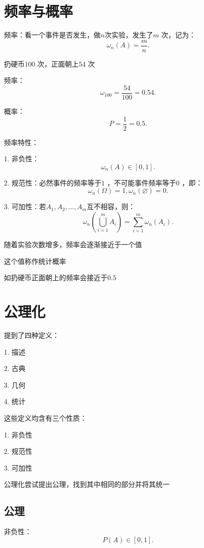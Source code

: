 \section{频率与概率}%
\label{sec:频率与概率}
频率：看一个事件是否发生，做$n $次实验，发生了$m$ 次，记为：
\[
    \omega_n\left( A \right) =\frac{m}{n}
.\] 
\begin{eg}
    扔硬币$100$ 次，正面朝上$54$ 次

    频率：\[
        \omega_{100}=\frac{54}{100}=0.54
    .\] 

    概率：\[
        P=\frac{1}{2}=0.5
    .\] 
\end{eg}
\begin{notation}
    频率特性：

    1. 非负性：\[
        \omega_n\left( A \right) \in \left[ 0,1 \right] 
    .\]
    
    2. 规范性：必然事件的频率等于$1$ ，不可能事件频率等于$0$ ，即：
    \[
        \omega_n\left( \Omega \right) =1,\omega_n\left( \varnothing \right) =0
    .\]

    3. 可加性：若$A_1,A_2,\ldots,A_m$互不相容，则：\[
        \omega_n\left( \bigcup_{i=1}^{m}A_i \right) =\sum_{i=1}^{m} \omega_n\left( A_i \right) 
    .\] 
\end{notation}
\begin{notation}
    随着实验次数增多，频率会逐渐接近于一个值

    这个值称作统计概率

    如扔硬币正面朝上的频率会接近于$0.5$
\end{notation}

\section{公理化}%
\label{sec:公理化}

提到了四种定义：

1. 描述

2. 古典

3. 几何

4. 统计

这些定义均含有三个性质：

1. 非负性

2. 规范性

3. 可加性

公理化尝试提出公理，找到其中相同的部分并将其统一
\subsection{公理}%
\label{sub:公理}
\begin{axiom}
    非负性：
    \[
        P\left( A \right) \in \left[ 0,1 \right] 
    .\] 
\end{axiom}

